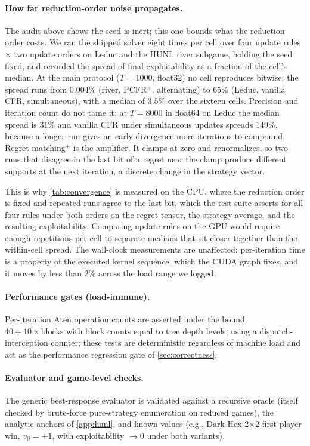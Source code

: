 \paragraph{How far reduction-order noise propagates.}
The audit above shows the seed is inert; this one bounds what the reduction order costs.
We ran the shipped solver eight times per cell over four update rules $\times$ two
update orders on Leduc and the HUNL river subgame, holding the seed fixed, and recorded
the spread of final exploitability as a fraction of the cell's median. At the main
protocol ($T{=}1000$, float32) no cell reproduces bitwise; the spread runs from $0.004\%$
(river, PCFR$^{+}$, alternating) to $65\%$ (Leduc, vanilla CFR, simultaneous), with a
median of $3.5\%$ over the sixteen cells. Precision and iteration count do not tame it:
at $T{=}8000$ in float64 on Leduc the median spread is $31\%$ and vanilla CFR under
simultaneous updates spreads $149\%$, because a longer run gives an early divergence more
iterations to compound. Regret matching$^{+}$ is the amplifier. It clamps at zero and
renormalizes, so two runs that disagree in the last bit of a regret near the clamp
produce different supports at the next iteration, a discrete change in the
strategy vector.

This is why \cref{tab:convergence} is measured on the CPU, where the reduction order is
fixed and repeated runs agree to the last bit, which the test suite asserts for all four
rules under both orders on the regret tensor, the strategy average, and the resulting
exploitability. Comparing update rules on the GPU would
require enough repetitions per cell to separate medians that sit closer together than
the within-cell spread. The wall-clock measurements are unaffected: per-iteration time
is a property of the executed kernel sequence, which the CUDA graph fixes, and it moves
by less than $2\%$ across the load range we logged.

\paragraph{Performance gates (load-immune).}
Per-iteration Aten operation counts are asserted under the bound
$40 + 10 \times \mathrm{blocks}$ with block counts equal to tree depth levels, using a
dispatch-interception counter; these tests are deterministic regardless of machine
load and act as the performance regression gate of \cref{sec:correctness}.

\paragraph{Evaluator and game-level checks.}
The generic best-response evaluator is validated against a recursive oracle (itself
checked by brute-force pure-strategy enumeration on reduced games), the analytic
anchors of \cref{app:hunl}, and known values (e.g., Dark Hex 2$\times$2 first-player
win, $v_0 = +1$, with exploitability $\to 0$ under both variants).
